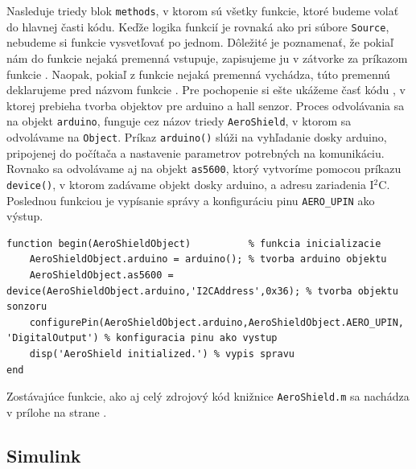 Nasleduje triedy blok \verb|methods|, v ktorom sú všetky funkcie, ktoré budeme volať do hlavnej časti kódu. Keďže logika funkcií je rovnaká ako pri súbore \verb|Source|, nebudeme si funkcie vysvetľovať po jednom. Dôležité je poznamenať, že pokiaľ nám do funkcie nejaká premenná vstupuje, zapisujeme ju v zátvorke za príkazom funkcie . Naopak, pokiaľ z funkcie nejaká premenná vychádza, túto premennú deklarujeme pred názvom funkcie . Pre pochopenie si ešte ukážeme časť kódu , v ktorej prebieha tvorba objektov pre arduino a hall senzor. Proces odvolávania sa na objekt \verb|arduino|, funguje cez názov triedy \verb|AeroShield|, v ktorom sa odvolávame na \verb|Object|. Príkaz \verb|arduino()| slúži na vyhľadanie dosky arduino, pripojenej do počítača a nastavenie parametrov potrebných na komunikáciu. Rovnako sa odvolávame aj na objekt \verb|as5600|, ktorý vytvoríme pomocou príkazu \verb|device()|, v ktorom zadávame objekt dosky arduino, a adresu zariadenia I$^2$C. Poslednou funkciou je vypísanie správy a konfiguráciu pinu \verb|AERO_UPIN| ako výstup. 

\begin{lstlisting}[caption={Knižnica AeroShield.m properties.},captionpos=b]
function begin(AeroShieldObject)          % funkcia inicializacie
	AeroShieldObject.arduino = arduino(); % tvorba arduino objektu
	AeroShieldObject.as5600 = device(AeroShieldObject.arduino,'I2CAddress',0x36); % tvorba objektu sonzoru
	configurePin(AeroShieldObject.arduino,AeroShieldObject.AERO_UPIN, 'DigitalOutput') % konfiguracia pinu ako vystup
	disp('AeroShield initialized.') % vypis spravu
end
\end{lstlisting}

Zostávajúce funkcie, ako aj celý zdrojový kód knižnice \verb|AeroShield.m| sa nachádza v prílohe na strane \pageref{AeroShield.m}. 

\newpage
\subsection{Simulink}

